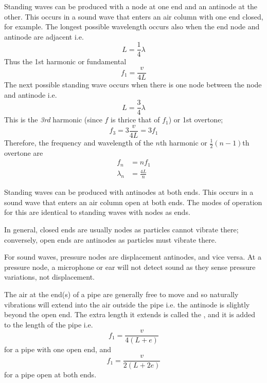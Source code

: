 \documentclass[Physics.tex]{subfiles}
\begin{document}
Standing waves can be produced with a node at one end and an antinode at the other. This occurs in a sound wave that enters an air column with one end closed, for example. The longest possible wavelength occurs also when the end node and antinode are adjacent i.e. \[L = \frac{1}{4}\lambda\] Thus the 1st harmonic or fundamental \[f_1 = \frac{v}{4L}\] The next possible standing wave occurs when there is one node between the node and antinode i.e. \[L = \frac{3}{4}\lambda\] This is the \emph{3rd} harmonic (since \(f\) is thrice that of \(f_1\)) or 1st overtone; \[f_3 = 3\frac{v}{4L} = 3f_1\] Therefore, the frequency and wavelength of the \(n\)th harmonic or \(\frac{1}{2}(n-1)\)th overtone are \begin{align*}f_n &= nf_1\\\lambda_n &= \frac{4L}{n}\end{align*}

Standing waves can be produced with antinodes at both ends. This occurs in a sound wave that enters an air column open at both ends. The modes of operation for this are identical to standing waves with nodes as ends.

In general, closed ends are usually nodes as particles cannot vibrate there; conversely, open ends are antinodes as particles must vibrate there.

For sound waves, pressure nodes are displacement antinodes, and vice versa. At a pressure node, a microphone or ear will not detect sound as they sense pressure variations, not displacement.

The air at the end(s) of a pipe are generally free to move and so naturally vibrations will extend into the air outside the pipe i.e. the antinode is slightly beyond the open end. The extra length it extends is called the , and it is added to the length of the pipe i.e. \[f_1 = \frac{v}{4(L+e)}\] for a pipe with one open end, and \[f_1 = \frac{v}{2(L+2e)}\] for a pipe open at both ends.
\end{document}
